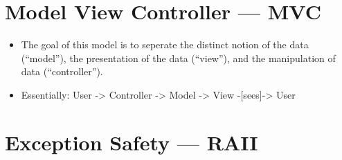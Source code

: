 \documentclass{article}
\begin{document}
\section{Model View Controller --- MVC} 
\begin{itemize}
\item The goal of this model is to seperate the distinct notion of the data (``model''), the presentation of the data (``view''), and the manipulation of data (``controller'').
\item Essentially: User -> Controller -> Model -> View -[sees]-> User
\end{itemize}

\section{Exception Safety --- RAII}
\end{document}
